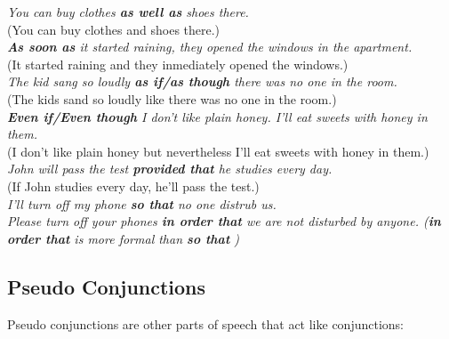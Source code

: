 \documentclass[hidelinks,10pt,a4paper]{article}
\begin{document}
\begin{center}
	\textit{You can buy clothes \textbf{as well as} shoes there.}\\
	(You can buy clothes and shoes there.)\\ \vspace{0.3cm}
	\textit{\textbf{As soon as} it started raining, they opened the windows in the apartment.}\\
	(It started raining and they inmediately opened the windows.)\\ \vspace{0.3cm}
	\textit{The kid sang so loudly \textbf{as if/as though} there was no one in the room.}\\
	(The kids sand so loudly like there was no one in the room.)\\ \vspace{0.3cm}
	\textit{\textbf{Even if/Even though} I don't like plain honey. I'll eat sweets with honey in them.}\\
	(I don't like plain honey but nevertheless I'll eat sweets with honey in them.)\\ \vspace{0.3cm}
	\textit{John will pass the test \textbf{provided that} he studies every day.}\\
	(If John studies every day, he'll pass the test.)\\ \vspace{0.3cm}
	\textit{I'll turn off my phone \textbf{so that} no one distrub us.} \\ \vspace{0.3cm}
	\textit{Please turn off your phones \textbf{in order that} we are not disturbed by anyone. (\textbf{in order that} is more formal than \textbf{so that} )}
\end{center}

\subsection{Pseudo Conjunctions}
Pseudo conjunctions are other parts of speech that act like conjunctions:
\end{document}
